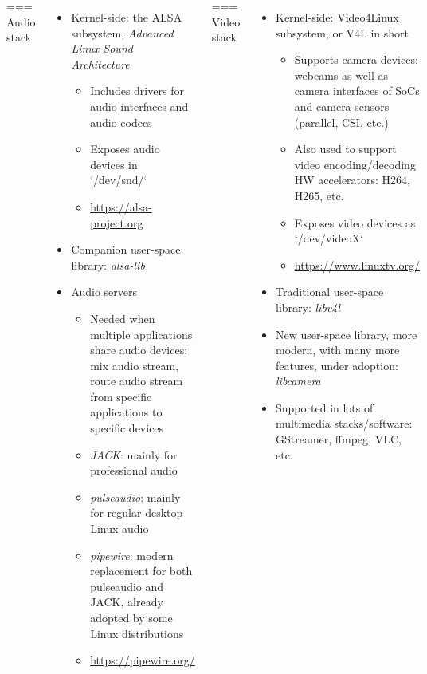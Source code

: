 \begin{columns}[T]
=== {Audio stack}
  \begin{itemize}
  \item Kernel-side: the ALSA subsystem, {\em Advanced Linux Sound
      Architecture}
    \begin{itemize}
    \item Includes drivers for audio interfaces and audio codecs
    \item Exposes audio devices in `/dev/snd/`
    \item \url{https://alsa-project.org}
    \end{itemize}
  \item Companion user-space library: {\em alsa-lib}
  \item Audio servers
    \begin{itemize}
    \item Needed when multiple applications share audio devices: mix
      audio stream, route audio stream from specific applications to
      specific devices
    \item {\em JACK}: mainly for professional audio
    \item {\em pulseaudio}: mainly for regular desktop Linux audio
    \item {\em pipewire}: modern replacement for both pulseaudio and
      JACK, already adopted by some Linux distributions
    \item \url{https://pipewire.org/}
    \end{itemize}
  \end{itemize}


=== {Video stack}
  \begin{itemize}
  \item Kernel-side: Video4Linux subsystem, or V4L in short
    \begin{itemize}
    \item Supports camera devices: webcams as well as camera
      interfaces of SoCs and camera sensors (parallel, CSI, etc.)
    \item Also used to support video encoding/decoding HW
      accelerators: H264, H265, etc.
    \item Exposes video devices as `/dev/videoX`
    \item \url{https://www.linuxtv.org/}
    \end{itemize}
  \item Traditional user-space library: {\em libv4l}
  \item New user-space library, more modern, with many more features,
    under adoption: {\em libcamera}
  \item Supported in lots of multimedia stacks/software: GStreamer,
    ffmpeg, VLC, etc.
  \end{itemize}



\end{columns}
